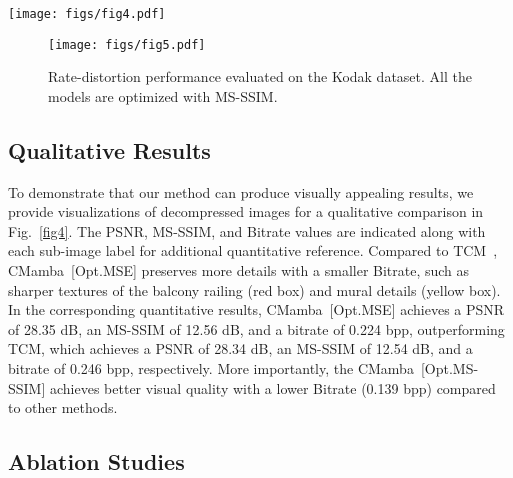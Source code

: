 \begin{figure*}[t]
  \centering
   \texttt{[image: figs/fig4.pdf]}
   \vspace{-1em}
   \caption{
    Visual comparison of the decompressed \textit{kodim24.png} image from the Kodak dataset using various compression methods. 
    Opt.MSE and Opt.MS-SSIM indicate that a model is optimized with MSE and MS-SSIM, respectively. 
    More visual comparisons are provided in the supplementary materials.
   }
   \label{fig4}
\end{figure*}


\begin{figure}[t]
  \centering
   \texttt{[image: figs/fig5.pdf]}
   \vspace{-1em}
   \caption{
   Rate-distortion performance evaluated on the Kodak dataset.
   All the models are optimized with MS-SSIM.
   }
   \vspace{-1em}
   \label{fig5}
\end{figure}


\subsection{Qualitative Results}

To demonstrate that our method can produce visually appealing results, we provide visualizations of decompressed images for a qualitative comparison in Fig.~\ref{fig4}. 
The PSNR, MS-SSIM, and Bitrate values are indicated along with each sub-image label for additional quantitative reference.
Compared to TCM~\cite{liu2023learned}, CMamba~[Opt.MSE] preserves more details with a smaller Bitrate, such as sharper textures of the balcony railing (\textcolor[RGB]{244, 0, 0}{red box}) and mural details (\textcolor[RGB]{223, 165, 0}{yellow box}).
In the corresponding quantitative results, CMamba~[Opt.MSE] achieves a PSNR of 28.35 dB, an MS-SSIM of 12.56 dB, and a bitrate of 0.224 bpp, outperforming TCM, which achieves a PSNR of 28.34 dB, an MS-SSIM of 12.54 dB, and a bitrate of 0.246 bpp, respectively.
More importantly, the CMamba~[Opt.MS-SSIM] achieves better visual quality with a lower Bitrate (0.139 bpp) compared to other methods.


\subsection{Ablation Studies}




